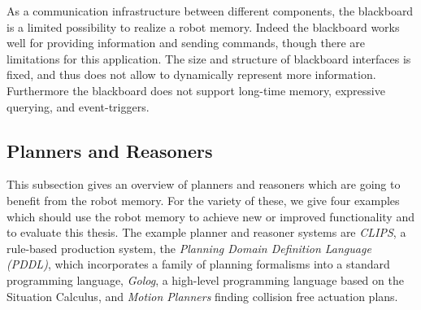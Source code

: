 \documentclass[a4paper,11pt]{article}
\begin{document}
As a communication infrastructure between different components, the
blackboard is a limited possibility to realize a robot memory.
Indeed the blackboard works well for providing information and
sending commands, though there are limitations for this
application. The size and structure of blackboard interfaces is fixed, and
thus does not allow to dynamically represent more information.
Furthermore the blackboard does not support long-time memory,
expressive querying, and event-triggers.

\subsection{Planners and Reasoners}
\label{sec:planners}
This subsection gives an overview of planners and reasoners which are
going to benefit from the robot memory. For the variety of these, we
give four examples which should use the robot memory to achieve new or
improved functionality and to evaluate this thesis. The example
planner and reasoner systems are \emph{CLIPS}, a rule-based production
system, the \emph{Planning Domain Definition Language (PDDL)}, which
incorporates a family of planning formalisms into a standard
programming language, \emph{Golog}, a high-level programming language
based on the Situation Calculus, and \emph{Motion Planners} finding
collision free actuation plans.
\end{document}
